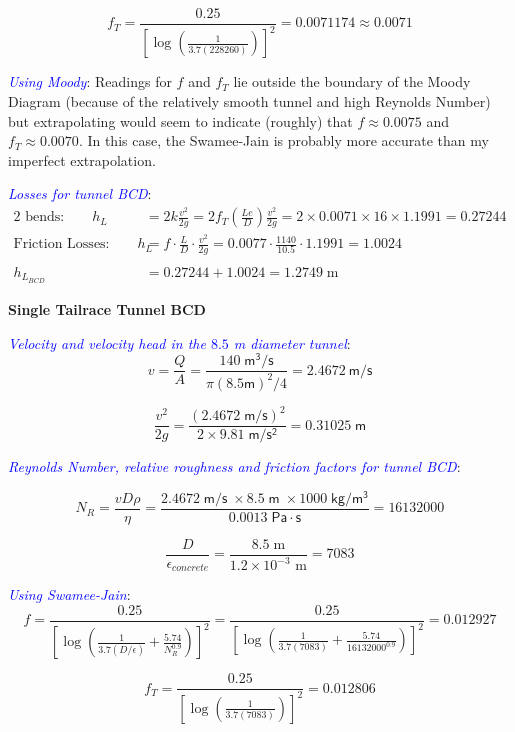 \documentclass[10pt,oneside]{amsart}
\begin{document}
\[
	f_T = \frac{0.25}{\left[\log\left(\frac{1}{3.7(228260)}\right)\right]^2} = 0.0071174\approx 0.0071
\]



\textcolor{blue}{\em Using Moody}:
Readings for $f$ and $f_T$ lie outside the boundary of the Moody Diagram (because of the relatively smooth tunnel and
high Reynolds Number) but extrapolating would seem to indicate (roughly) that $f\approx 0.0075$ and $f_T\approx
0.0070$. In this case, the Swamee-Jain is probably more accurate than my imperfect extrapolation.

\textcolor{blue}{\em Losses for tunnel BCD}:
\begin{align*}
	\text{2 bends:}\qquad h_{L}         & = 2k\frac{v^2}{2g} =                      
	2f_T\left(\frac{Le}{D}\right)\frac{v^2}{2g}=2\times 0.0071\times 16\times 1.1991 = 0.27244\\
	\text{Friction Losses:}\qquad h_{L} & = f\cdot\frac{L}{D} \cdot\frac{v^2}{2g} = 
	0.0077\cdot\frac{1140}{10.5}\cdot1.1991 = 1.0024\\\\
	h_{L_{BCD}}                         & = 0.27244+1.0024 = 1.2749\;\text{m}       
\end{align*}

\textbf{Single Tailrace Tunnel BCD}

\textcolor{blue}{\em Velocity and velocity head in the $8.5$ m diameter tunnel}:\\

\[
	v = \frac{Q}{A} = \frac{140\mathsf{\;m^3/s}}{\pi(8.5\mathsf{ m})^2/4}=2.4672\mathsf{\ m/s}
\]

\[
	\frac{v^2}{2g} = \frac{(2.4672\mathsf{\;m/s})^2}{2\times9.81\mathsf{\;m/s^2}} = 0.31025\mathsf{\; m}
\]

\textcolor{blue}{\em Reynolds Number, relative roughness and friction factors for tunnel BCD}:

\[
	N_R = \frac{vD\rho}{\eta} =
	\frac{2.4672\mathsf{\;m/s\;}\times8.5\mathsf{\;m\;}\times1000\mathsf{\;kg/m^3}}{0.0013\;\mathsf{Pa\cdot s}} =
	16132000
\]

\[
	\frac{D}{\epsilon_{concrete}} = \frac{8.5\;\text{m}}{1.2\times10^{-3}\text{ m}} = 7083
\]

\textcolor{blue}{\em Using Swamee-Jain}:
\[
	f = \frac{0.25}{\left[\log\left(\frac{1}{3.7(D/\epsilon)}+\frac{5.74}{N_R^{0.9}}\right)\right]^2} =
	\frac{0.25}{\left[\log\left(\frac{1}{3.7(7083)}+\frac{5.74}{16132000^{0.9}}\right)\right]^2}=0.012927
\]

\[
	f_T = \frac{0.25}{\left[\log\left(\frac{1}{3.7(7083)}\right)\right]^2} = 0.012806
\]
\end{document}
